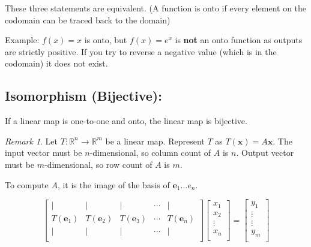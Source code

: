 \documentclass[12pt]{article}
\theoremstyle{plain}
\theoremstyle{remark}
\newtheorem{remark}{Remark}
\theoremstyle{definition}
\begin{document}
These three statements are equivalent. (A function is onto if every
element on the codomain can be traced back to the domain)

Example: \(f(x) = x\) is onto, but \(f(x) = e^{x}\) is \textbf{not} an
onto function as outputs are strictly positive. If you try to reverse a
negative value (which is in the codomain) it does not exist.


\subsection{Isomorphism (Bijective):}

If a linear map is one-to-one and onto, the linear map is bijective.


\begin{remark}
Let \(T:\mathbb{R}^{n} \rightarrow \mathbb{R}^{m}\) be
a linear map. Represent \(T\) as
\(T\left( \mathbf{x} \right) = A\mathbf{x}\). The input vector
must be \(n\)-dimensional, so column count of \(A\) is \(n\). Output
vector must be \(m\)-dimensional, so row count of \(A\) is \(m\).
\end{remark}

To compute \(A\), it is the image of the basis of
\({\mathbf{e}}_{1}\ldots e_{n}\).

\[\begin{bmatrix}
 \mid & \mid & \mid & \cdots & \mid \\
T\left( {\mathbf{e}}_{1} \right) & T\left( {\mathbf{e}}_{2} \right) & T\left( {\mathbf{e}}_{3} \right) & \cdots & T\left( {\mathbf{e}}_{n} \right) \\
 \mid & \mid & \mid & \cdots & \mid \\
\end{bmatrix}\begin{bmatrix}
x_{1} \\
x_{2} \\
 \vdots \\
x_{n} \\
\end{bmatrix} = \begin{bmatrix}
y_{1} \\
 \vdots \\
 \vdots \\
y_{m} \\
\end{bmatrix}\]
\end{document}
